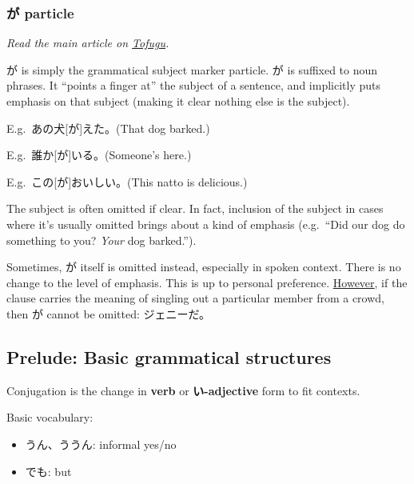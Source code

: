 \documentclass[../nihongo-gakushuu-kyouzai.tex]{subfiles}
\begin{document}
\subsubsection{が particle}
\emph{Read the main article on \href{https://www.tofugu.com/japanese-grammar/particle-ga/}{Tofugu}.}


が is simply the grammatical subject marker particle. が is suffixed to noun phrases. It ``points a finger at'' the subject of a sentence, and implicitly puts emphasis on that subject (making it clear nothing else is the subject).

E.g.\ あの犬[が]えた。(That dog barked.)

E.g.\ 誰か[が]いる。(Someone's here.)

E.g.\ この[が]おいしい。(This natto is delicious.)


The subject is often omitted if clear. In fact, inclusion of the subject in cases where it's usually omitted brings about a kind of emphasis (e.g.\ ``Did our dog do something to you? \emph{Your} dog barked.'').

Sometimes, が itself is omitted instead, especially in spoken context. There is no change to the level of emphasis. This is up to personal preference. \ul{However}, if the clause carries the meaning of singling out a particular member from a crowd, then が cannot be omitted: ジェニーだ。


\subsection{Prelude: Basic grammatical structures}
Conjugation is the change in \textbf{verb} or \textbf{い-adjective} form to fit contexts.

Basic vocabulary:
\begin{itemize}
    \item うん、ううん: informal yes/no
    \item でも: but
\end{itemize}
\end{document}
